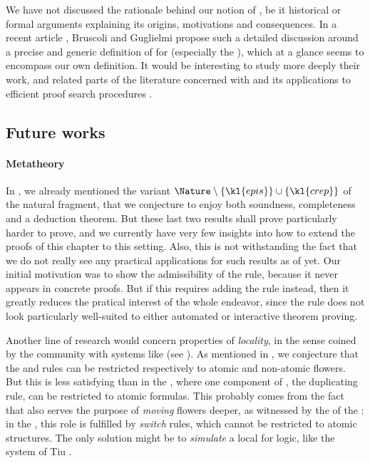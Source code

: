 \begin{scope}
We have not discussed the rationale behind our notion of , be it
historical or formal arguments explaining its origins, motivations and
consequences. In a recent article , Bruscoli
and Guglielmi propose such a detailed discussion around a precise and generic
definition of  for   (especially
the ), which at a glance seems to encompass our own
definition. It would be interesting to study more deeply their work, and related
parts of the  literature concerned with  and its
applications to efficient proof search procedures
.

\subsection{Future works}

\paragraph{Metatheory}

In , we already mentioned the variant $\Nature \setminus
\{\kl{epis}\} \cup \{\kl{crep}\}$ of the natural fragment, that we conjecture
to enjoy both soundness, completeness and a deduction theorem. But these last
two results shall prove particularly harder to prove, and we currently have very
few insights into how to extend the proofs of this chapter to this setting.
Also, this is not withstanding the fact that we do not really see any practical
applications for such results as of yet. Our initial motivation was to show the
admissibility of the  rule, because it never appears in concrete
proofs. But if this requires adding the  rule instead, then it greatly
reduces the pratical interest of the whole endeavor, since the  rule
does not look particularly well-suited to either automated or interactive
theorem proving.

Another line of research would concern properties of \emph{locality}, in the
sense coined by the  community with systems like  (see
). As mentioned in , we
conjecture that the  and  rules can be restricted
respectively to atomic and non-atomic flowers. But this is less satisfying than
in the , where one component of , the
duplicating \emph{} rule, can be restricted to atomic formulas. This
probably comes from the fact that  also serves the purpose of
\emph{moving} flowers deeper, as witnessed by the    of
the : in the , this role is fulfilled by
\emph{switch} rules, which cannot be restricted to atomic structures. The only
solution might be to \emph{simulate} a local  for
 logic, like the system  of Tiu
.


\end{scope}
